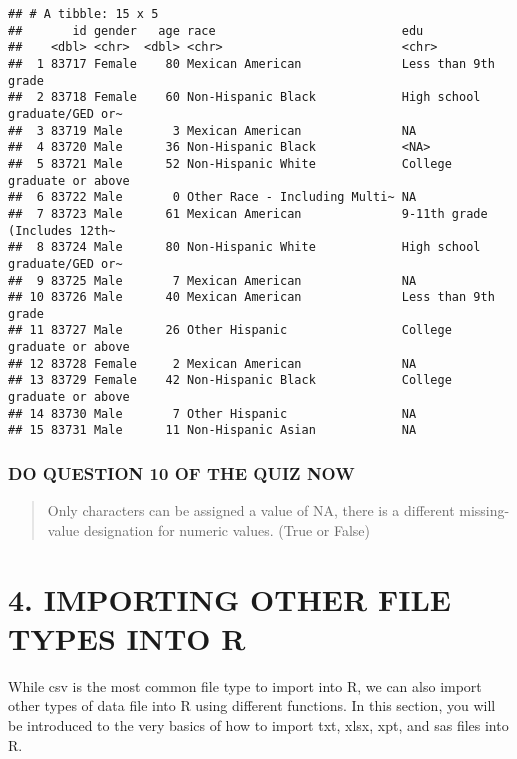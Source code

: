 \documentclass[
]{book}
\begin{document}
\begin{verbatim}
## # A tibble: 15 x 5
##       id gender   age race                          edu                         
##    <dbl> <chr>  <dbl> <chr>                         <chr>                       
##  1 83717 Female    80 Mexican American              Less than 9th grade         
##  2 83718 Female    60 Non-Hispanic Black            High school graduate/GED or~
##  3 83719 Male       3 Mexican American              NA                          
##  4 83720 Male      36 Non-Hispanic Black            <NA>                        
##  5 83721 Male      52 Non-Hispanic White            College graduate or above   
##  6 83722 Male       0 Other Race - Including Multi~ NA                          
##  7 83723 Male      61 Mexican American              9-11th grade (Includes 12th~
##  8 83724 Male      80 Non-Hispanic White            High school graduate/GED or~
##  9 83725 Male       7 Mexican American              NA                          
## 10 83726 Male      40 Mexican American              Less than 9th grade         
## 11 83727 Male      26 Other Hispanic                College graduate or above   
## 12 83728 Female     2 Mexican American              NA                          
## 13 83729 Female    42 Non-Hispanic Black            College graduate or above   
## 14 83730 Male       7 Other Hispanic                NA                          
## 15 83731 Male      11 Non-Hispanic Asian            NA
\end{verbatim}

\hypertarget{do-question-10-of-the-quiz-now-1}{%
\subsubsection{DO QUESTION 10 OF THE QUIZ NOW}\label{do-question-10-of-the-quiz-now-1}}

\begin{quote}
Only characters can be assigned a value of NA, there is a different missing-value designation for numeric values. (True or False)
\end{quote}

\hypertarget{importing-other-file-types-into-r}{%
\section{4. IMPORTING OTHER FILE TYPES INTO R}\label{importing-other-file-types-into-r}}

While csv is the most common file type to import into R, we can also import other types of data file into R using different functions. In this section, you will be introduced to the very basics of how to import txt, xlsx, xpt, and sas files into R.
\end{document}
